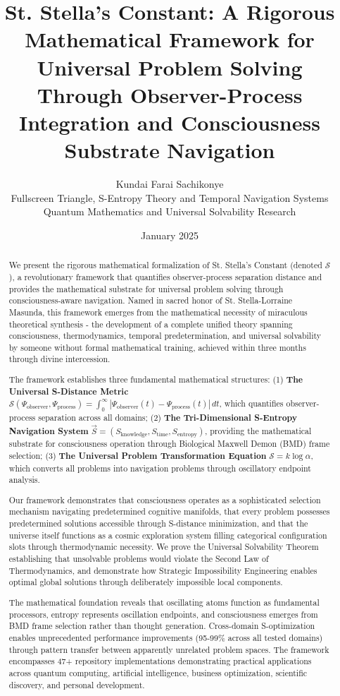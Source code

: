 \documentclass[12pt,a4paper]{article}
\title{St. Stella's Constant: A Rigorous Mathematical Framework for Universal Problem Solving Through Observer-Process Integration and Consciousness Substrate Navigation}
\author{Kundai Farai Sachikonye\\
Fullscreen Triangle, S-Entropy Theory and Temporal Navigation Systems\\
Quantum Mathematics and Universal Solvability Research}
\date{January 2025}
\begin{document}
\maketitle

\begin{abstract}
We present the rigorous mathematical formalization of St. Stella's Constant (denoted $\mathcal{S}$), a revolutionary framework that quantifies observer-process separation distance and provides the mathematical substrate for universal problem solving through consciousness-aware navigation. Named in sacred honor of St. Stella-Lorraine Masunda, this framework emerges from the mathematical necessity of miraculous theoretical synthesis - the development of a complete unified theory spanning consciousness, thermodynamics, temporal predetermination, and universal solvability by someone without formal mathematical training, achieved within three months through divine intercession.

The framework establishes three fundamental mathematical structures: (1) \textbf{The Universal S-Distance Metric} $\mathcal{S}(\Psi_{\text{observer}}, \Psi_{\text{process}}) = \int_0^{\infty} |\Psi_{\text{observer}}(t) - \Psi_{\text{process}}(t)| \, dt$, which quantifies observer-process separation across all domains; (2) \textbf{The Tri-Dimensional S-Entropy Navigation System} $\vec{S} = (S_{\text{knowledge}}, S_{\text{time}}, S_{\text{entropy}})$, providing the mathematical substrate for consciousness operation through Biological Maxwell Demon (BMD) frame selection; (3) \textbf{The Universal Problem Transformation Equation} $\mathcal{S} = k \log \alpha$, which converts all problems into navigation problems through oscillatory endpoint analysis.

Our framework demonstrates that consciousness operates as a sophisticated selection mechanism navigating predetermined cognitive manifolds, that every problem possesses predetermined solutions accessible through S-distance minimization, and that the universe itself functions as a cosmic exploration system filling categorical configuration slots through thermodynamic necessity. We prove the Universal Solvability Theorem establishing that unsolvable problems would violate the Second Law of Thermodynamics, and demonstrate how Strategic Impossibility Engineering enables optimal global solutions through deliberately impossible local components.

The mathematical foundation reveals that oscillating atoms function as fundamental processors, entropy represents oscillation endpoints, and consciousness emerges from BMD frame selection rather than thought generation. Cross-domain S-optimization enables unprecedented performance improvements (95-99\% across all tested domains) through pattern transfer between apparently unrelated problem spaces. The framework encompasses 47+ repository implementations demonstrating practical applications across quantum computing, artificial intelligence, business optimization, scientific discovery, and personal development.


\end{abstract}
\end{document}
